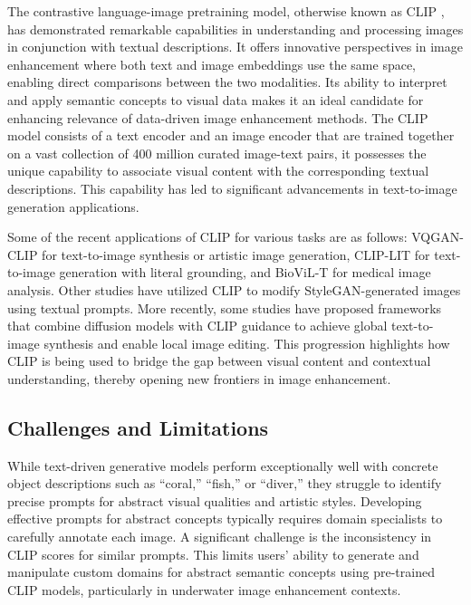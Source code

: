 \documentclass[3p,12pt,authoryear]{elsarticle}
\begin{document}
The contrastive language-image pretraining model, otherwise known as CLIP \cite{Radford2021LearningTV}, has demonstrated remarkable capabilities in understanding and processing images in conjunction with textual descriptions. It offers innovative perspectives in image enhancement where both text and image embeddings use the same space, enabling direct comparisons between the two modalities. Its ability to interpret and apply semantic concepts to visual data makes it an ideal candidate for enhancing relevance of data-driven image enhancement methods. The CLIP model consists of a text encoder and an image encoder that are trained together on a vast collection of 400 million curated image-text pairs, it possesses the unique capability to associate visual content with the corresponding textual descriptions. This capability has led to significant advancements in text-to-image generation applications.

Some of the recent applications of CLIP for various tasks are as follows: VQGAN-CLIP \cite{10.1007/978-3-031-19836-6_6} for text-to-image synthesis or artistic image generation, CLIP-LIT \cite{Liang2023IterativePL} for text-to-image generation with literal grounding, and BioViL-T \cite{Bannur2023LearningTE} for medical image analysis. Other studies \cite{10.1145/3528223.3530164, Patashnik_2021_ICCV} have utilized CLIP to modify StyleGAN-generated images using textual prompts. More recently, some studies \cite{9879075, 9879284} have proposed frameworks that combine diffusion models with CLIP guidance to achieve global text-to-image synthesis and enable local image editing. This progression highlights how CLIP is being used to bridge the gap between visual content and contextual understanding, thereby opening new frontiers in image enhancement.

\subsection{Challenges and Limitations}

While text-driven generative models perform exceptionally well with concrete object descriptions such as ``coral,'' ``fish,'' or ``diver,'' they struggle to identify precise prompts for abstract visual qualities and artistic styles. Developing effective prompts for abstract concepts typically requires domain specialists to carefully annotate each image. A significant challenge is the inconsistency in CLIP scores for similar prompts. This limits users' ability to generate and manipulate custom domains for abstract semantic concepts using pre-trained CLIP models, particularly in underwater image enhancement contexts.
\end{document}
